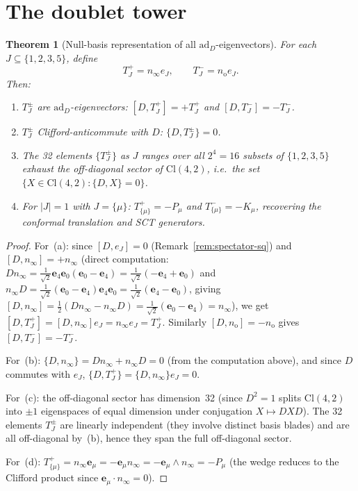 \documentclass{birkjour}
\newtheorem{thm}{Theorem}[section]
\theoremstyle{definition}
\theoremstyle{remark}
\numberwithin{equation}{section}
\newcommand{\Cl}{\mathrm{Cl}}
\newcommand{\e}[1]{\bm{e}_{#1}}
\newcommand{\no}{n_{\mathrm{o}}}
\newcommand{\ninf}{n_{\infty}}
\newcommand{\ad}{\mathrm{ad}}
\begin{document}
\section{The doublet tower}\label{sec:tower}

\begin{thm}[Null-basis representation of all
$\ad_D$-eigenvectors]\label{thm:tower}
For each $J\subseteq\{1,2,3,5\}$, define
\begin{equation}\label{eq:TpmJ}
T^+_J = \ninf  e_J,\qquad
T^-_J = \no e_J.
\end{equation}
Then:
\begin{enumerate}[label=\textup{(\alph*)}]
\item $T^\pm_J$ are $\ad_D$-eigenvectors:
$[D,T^+_J]=+T^+_J$ and $[D,T^-_J]=-T^-_J$.
\item $T^\pm_J$ Clifford-anticommute with $D$:
$\{D,T^\pm_J\}=0$.
\item The 32 elements $\{T^\pm_J\}$ as $J$ ranges over
all $2^4=16$ subsets of $\{1,2,3,5\}$ exhaust the
off-diagonal sector of $\Cl(4,2)$,
i.e.\ the set $\{X\in\Cl(4,2):\{D,X\}=0\}$.
\item For $|J|=1$ with $J=\{\mu\}$:
$T^+_{\{\mu\}}=-P_\mu$ and $T^-_{\{\mu\}}=-K_\mu$,
recovering the conformal translation and SCT generators.
\end{enumerate}
\end{thm}

\begin{proof}
For~(a): since $[D,e_J]=0$
(Remark~\ref{rem:spectator-sq}) and
$[D,\ninf]=+\ninf$ (direct computation:
$D\ninf=\tfrac{1}{\sqrt2}\e{4}\e{0}(\e{0}-\e{4})
=\tfrac{1}{\sqrt2}(-\e{4}+\e{0})$ and
$\ninf D=\tfrac{1}{\sqrt2}(\e{0}-\e{4})\e{4}\e{0}
=\tfrac{1}{\sqrt2}(\e{4}-\e{0})$,
giving $[D,\ninf]=\tfrac12(D\ninf-\ninf D)
=\tfrac{1}{\sqrt2}(\e{0}-\e{4})=\ninf$),
we get $[D,T^+_J]=[D,\ninf]  e_J=\ninf  e_J=T^+_J$.
Similarly $[D,\no]=-\no$ gives $[D,T^-_J]=-T^-_J$.

For~(b): $\{D,\ninf\}=D\ninf+\ninf D=0$
(from the computation above), and since $D$ commutes with
$e_J$,
$\{D,T^+_J\}=\{D,\ninf\} e_J=0$.

For~(c): the off-diagonal sector has dimension~32
(since $D^2=1$ splits $\Cl(4,2)$ into $\pm1$ eigenspaces
of equal dimension under conjugation $X\mapsto DXD$).
The 32 elements $T^\pm_J$ are linearly independent (they
involve distinct basis blades) and are all off-diagonal
by~(b), hence they span the full off-diagonal sector.

For~(d):
$T^+_{\{\mu\}}=\ninf \e{\mu}
=-\e{\mu} \ninf=-\e{\mu}\wedge\ninf=-P_\mu$
(the wedge reduces to the Clifford product since
$\e{\mu} \cdot \ninf=0$).
\end{proof}
\end{document}
